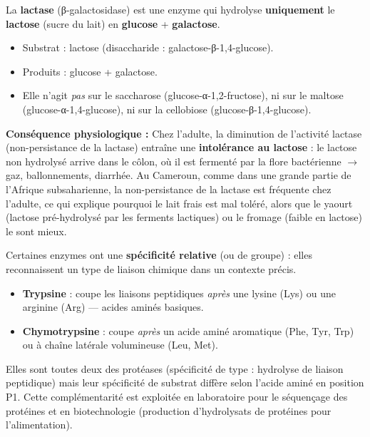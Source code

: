 \documentclass[11pt]{article}
\begin{document}
\begin{exemplebox}
La \textbf{lactase} (β-galactosidase) est une enzyme qui hydrolyse \textbf{uniquement} le \textbf{lactose} (sucre du lait) en \textbf{glucose} + \textbf{galactose}.
\begin{itemize}
    \item Substrat : lactose (disaccharide : galactose-β-1,4-glucose).
    \item Produits : glucose + galactose.
    \item Elle n'agit \emph{pas} sur le saccharose (glucose-α-1,2-fructose), ni sur le maltose (glucose-α-1,4-glucose), ni sur la cellobiose (glucose-β-1,4-glucose).
\end{itemize}
\textbf{Conséquence physiologique :} Chez l'adulte, la diminution de l'activité lactase (non-persistance de la lactase) entraîne une \textbf{intolérance au lactose} : le lactose non hydrolysé arrive dans le côlon, où il est fermenté par la flore bactérienne $\rightarrow$ gaz, ballonnements, diarrhée. Au Cameroun, comme dans une grande partie de l'Afrique subsaharienne, la non-persistance de la lactase est fréquente chez l'adulte, ce qui explique pourquoi le lait frais est mal toléré, alors que le yaourt (lactose pré-hydrolysé par les ferments lactiques) ou le fromage (faible en lactose) le sont mieux.
\end{exemplebox}

\begin{exemplebox}
Certaines enzymes ont une \textbf{spécificité relative} (ou de groupe) : elles reconnaissent un type de liaison chimique dans un contexte précis.
\begin{itemize}
    \item \textbf{Trypsine} : coupe les liaisons peptidiques \emph{après} une lysine (Lys) ou une arginine (Arg) — acides aminés basiques.
    \item \textbf{Chymotrypsine} : coupe \emph{après} un acide aminé aromatique (Phe, Tyr, Trp) ou à chaîne latérale volumineuse (Leu, Met).
\end{itemize}
Elles sont toutes deux des protéases (spécificité de type : hydrolyse de liaison peptidique) mais leur spécificité de substrat diffère selon l'acide aminé en position P1. Cette complémentarité est exploitée en laboratoire pour le séquençage des protéines et en biotechnologie (production d'hydrolysats de protéines pour l'alimentation).
\end{exemplebox}
\end{document}
